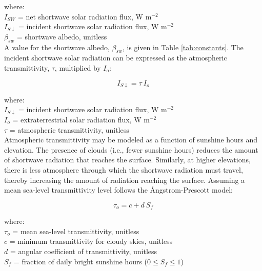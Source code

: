 \noindent where: \\
\indent $I_{SW}$ = net shortwave solar radiation flux, W m$^{-2}$ \\
\indent $I_{S\downarrow}$ = incident shortwave solar radiation flux, W m$^{-2}$ \\
\indent $\beta_{sw}$ = shortwave albedo, unitless \\

\noindent A value for the shortwave albedo, $\beta_{sw}$, is given in Table \ref{tab:constants}. 
The incident shortwave solar radiation can be expressed as the atmospheric transmittivity, $\tau$, multiplied by $I_o$:

\begin{equation}
\label{eq:rs}
	I_{S\downarrow} = \tau\: I_o
\end{equation}

\noindent where: \\
\indent $I_{S\downarrow}$ = incident shortwave solar radiation flux, W m$^{-2}$ \\
\indent $I_o$ = extraterrestrial solar radiation flux, W m$^{-2}$ \\
\indent $\tau$ = atmospheric transmittivity, unitless \\

Atmospheric transmittivity may be modeled as a function of sunshine hours and elevation. 
The presence of clouds (i.e., fewer sunshine hours) reduces the amount of shortwave radiation that reaches the surface. 
Similarly, at higher elevations, there is less atmosphere through which the shortwave radiation must travel, thereby increasing the amount of radiation reaching the surface. 
Assuming a mean sea-level transmittivity level follows the \r{A}ngstrom-Prescott model:

\begin{equation}
\label{eq:tauo}
	\tau_o = c + d\: S_f 
\end{equation}

\noindent where: \\
\indent $\tau_o$ = mean sea-level transmittivity, unitless \\
\indent $c$ = minimum transmittivity for cloudy skies, unitless \\
\indent $d$ = angular coefficient of transmittivity, unitless \\
\indent $S_f$ = fraction of daily bright sunshine hours ($0\leq S_f\leq 1$) \\


